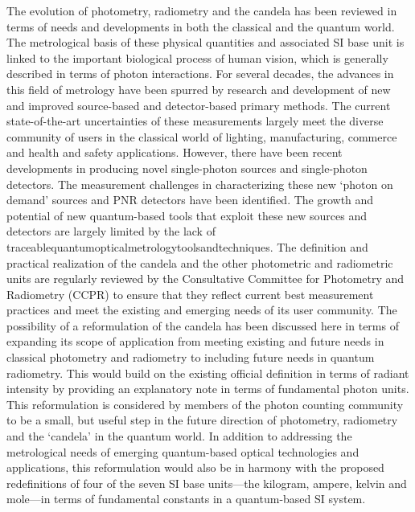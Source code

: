 			The evolution of photometry, radiometry and the candela has been reviewed in terms of needs and developments in both the classical and the quantum world. The metrological basis of these physical quantities and associated SI base unit is linked to the important biological process of human vision, which is generally described in terms of photon interactions. For several decades, the advances in this field of metrology have been spurred by research and development of new and improved source-based and detector-based primary methods. The current state-of-the-art uncertainties of these measurements largely meet the diverse community of users in the classical world of lighting, manufacturing, commerce and health and safety applications. However, there have been recent developments in producing novel single-photon sources and single-photon detectors. The measurement challenges in characterizing these new ‘photon on demand’ sources and PNR detectors have been identified. The growth and potential of new quantum-based tools that exploit these new sources and detectors are largely limited by the lack of traceablequantumopticalmetrologytoolsandtechniques. The definition and practical realization of the candela and the other photometric and radiometric units are regularly reviewed by the Consultative Committee for Photometry and Radiometry (CCPR) to ensure that they reflect current best measurement practices and meet the existing and emerging needs of its user community. The possibility of a reformulation of the candela has been discussed here in terms of expanding its scope of application from meeting existing and future needs in classical photometry and radiometry to including future needs in quantum radiometry. This would build on the existing official definition in terms of radiant intensity by providing an explanatory note in terms of fundamental photon units. This reformulation is considered by members of the photon counting community to be a small, but useful step in the future direction of photometry, radiometry and the ‘candela’ in the quantum world. In addition to addressing the metrological needs of emerging quantum-based optical technologies and applications, this reformulation would also be in harmony with the proposed redefinitions of four of the seven SI base units—the kilogram, ampere, kelvin and mole—in terms of fundamental constants in a quantum-based SI system.
